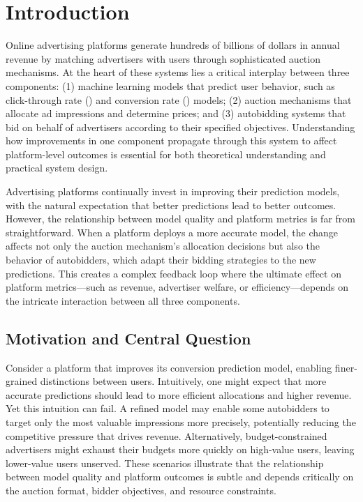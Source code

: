 
\section{Introduction}
\label{sec:introduction}

Online advertising platforms generate hundreds of billions of dollars in annual revenue by matching advertisers with users through sophisticated auction mechanisms. At the heart of these systems lies a critical interplay between three components: (1) machine learning models that predict user behavior, such as click-through rate (\pctr{}) and conversion rate (\pcvr{}) models; (2) auction mechanisms that allocate ad impressions and determine prices; and (3) autobidding systems that bid on behalf of advertisers according to their specified objectives. Understanding how improvements in one component propagate through this system to affect platform-level outcomes is essential for both theoretical understanding and practical system design.

Advertising platforms continually invest in improving their prediction models, with the natural expectation that better predictions lead to better outcomes. However, the relationship between model quality and platform metrics is far from straightforward. When a platform deploys a more accurate \pctr{} model, the change affects not only the auction mechanism's allocation decisions but also the behavior of autobidders, which adapt their bidding strategies to the new predictions. This creates a complex feedback loop where the ultimate effect on platform metrics---such as revenue, advertiser welfare, or efficiency---depends on the intricate interaction between all three components.

\subsection{Motivation and Central Question}

Consider a platform that improves its conversion prediction model, enabling finer-grained distinctions between users. Intuitively, one might expect that more accurate predictions should lead to more efficient allocations and higher revenue. Yet this intuition can fail. A refined model may enable some autobidders to target only the most valuable impressions more precisely, potentially reducing the competitive pressure that drives revenue. Alternatively, budget-constrained advertisers might exhaust their budgets more quickly on high-value users, leaving lower-value users unserved. These scenarios illustrate that the relationship between model quality and platform outcomes is subtle and depends critically on the auction format, bidder objectives, and resource constraints.

